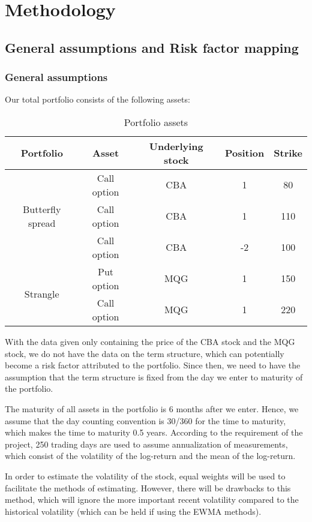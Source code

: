 \section{Methodology}
\subsection{General assumptions and Risk factor mapping}
\subsubsection{General assumptions}
Our total portfolio consists of the following assets:
\begin{table}[h]
    \centering
    \begin{tabular}{|c|c|c|c|c|}
    \hline
    Portfolio & Asset & Underlying stock& Position & Strike \\
    \hline
    \multirow{3}{*}{Butterfly spread} & Call option & CBA & 1 & 80\\ \cline{2-5}
                             & Call option & CBA & 1 & 110 \\ \cline{2-5}
                              & Call option & CBA & -2 & 100 \\
    \hline
    \multirow{2}{*}{Strangle} & Put option & MQG & 1 & 150\\ \cline{2-5}
                             & Call option & MQG & 1 & 220 \\ 
    \hline
    \end{tabular}
    \caption{Portfolio assets}
    \label{tab:Portfolio assets}
\end{table}

With the data given only containing the price of the CBA stock and the MQG stock, we do not have the data on the term structure, which can potentially become a risk factor attributed to the portfolio. Since then, we need to have the assumption that the term structure is fixed from the day we enter to maturity of the portfolio.

The maturity of all assets in the portfolio is 6 months after we enter. Hence, we assume that the day counting convention is 30/360 for the time to maturity, which makes the time to maturity 0.5 years. According to the requirement of the project, 250 trading days are used to assume annualization of measurements, which consist of the volatility of the log-return and the mean of the log-return.

In order to estimate the volatility of the stock, equal weights will be used to facilitate the methods of estimating. However, there will be drawbacks to this method, which will ignore the more important recent volatility compared to the historical volatility (which can be held if using the EWMA methods).

